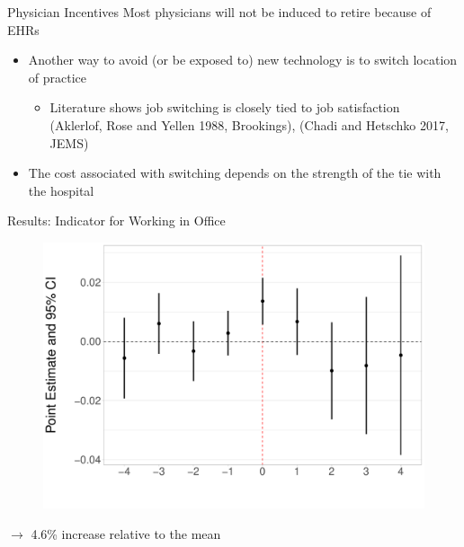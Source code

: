 \documentclass[10pt]{beamer}
\begin{document}
\begin{frame}{Physician Incentives}
Most physicians will not be induced to retire because of EHRs
\begin{itemize}
    \item Another way to avoid (or be exposed to) new technology is to switch location of practice
    \begin{itemize}
                \vspace{3mm}
        \item Literature shows job switching is closely tied to job satisfaction\\ \scriptsize (Aklerlof, Rose and Yellen 1988, Brookings), (Chadi and Hetschko 2017, JEMS)
    \end{itemize}
                \vspace{6mm}
                \pause
    \item The cost associated with switching depends on the strength of the tie with the hospital
    \end{itemize}
\end{frame}

\begin{frame}{Results: Indicator for Working in Office}
\begin{figure}[ht]
    \centering
    \includegraphics[scale=.35]{Objects/Presentation_office_all.pdf}
\end{figure}
$\rightarrow$ 4.6\% increase relative to the mean
\end{frame}
\end{document}
